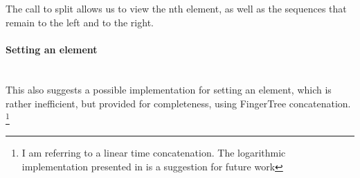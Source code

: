 \documentclass[12pt,twoside,notitlepage]{report}
\begin{document}
\begin{code}
\>[0]\<[4]%
\>[4]\AgdaFunction{\_!\_} \AgdaSymbol{:}  \AgdaSymbol{\{}\AgdaSymbol{\}\{} \AgdaSymbol{:}  \AgdaSymbol{\}\{} \AgdaSymbol{:} \AgdaSymbol{\}}         \<%
\\
\>[0]\<[4]%
\>[4] \AgdaFunction{!}       \AgdaSymbol{(} \AgdaSymbol{)}  \AgdaSymbol{)} \AgdaSymbol{(} \AgdaSymbol{)} \<%
\\
\>[0]\<[4]%
\>[4] \AgdaFunction{!}  \AgdaSymbol{|}  \AgdaSymbol{(} \AgdaSymbol{\_}  \AgdaSymbol{\_)} \AgdaSymbol{=}  \AgdaSymbol{(} \AgdaSymbol{)}\<%
\\
\>[0]\<[4]%
\>[4] \AgdaFunction{!}  \AgdaSymbol{|}  \AgdaSymbol{=} \<%
\\
\end{code}

The call to split allows us to view the nth element, as well as the sequences that remain to the left and to the right.

\paragraph{Setting an element} \mbox{} \\
This also suggests a possible implementation for setting an element, which is rather inefficient, but provided for completeness, using FingerTree concatenation. \footnote{I am referring to a linear time concatenation. The logarithmic implementation presented in \cite{fingertrees} is a suggestion for future work}
\end{document}
